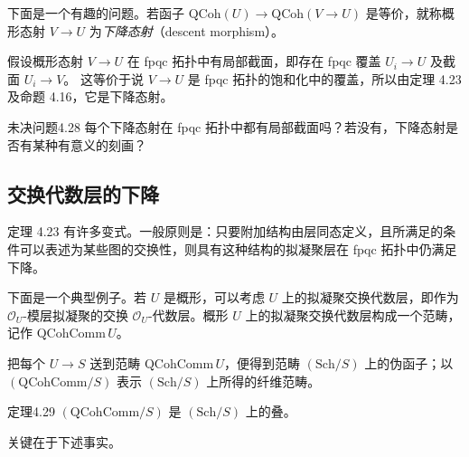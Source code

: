 下面是一个有趣的问题。若函子 $\mathrm{QCoh}(U)\to\mathrm{QCoh}(V\to U)$ 是等价，就称概形态射 $V\to U$ 为\emph{下降态射}（descent morphism）。

假设概形态射 $V\to U$ 在 fpqc 拓扑中有局部截面，即存在 fpqc 覆盖 $U_i\to U$ 及截面 $U_i\to V$。
这等价于说 $V\to U$ 是 fpqc 拓扑的饱和化中的覆盖，所以由定理 4.23 及命题 4.16，它是下降态射。

\begin{origstatement}{未决问题}{4.28}\label{ch04:question428}
每个下降态射在 fpqc 拓扑中都有局部截面吗？若没有，下降态射是否有某种有意义的刻画？
\end{origstatement}

\subsection{交换代数层的下降}
定理 4.23 有许多变式。一般原则是：只要附加结构由层同态定义，且所满足的条件可以表述为某些图的交换性，则具有这种结构的拟凝聚层在 fpqc 拓扑中仍满足下降。

下面是一个典型例子。若 $U$ 是概形，可以考虑 $U$ 上的拟凝聚交换代数层，即作为 $\mathcal O_U$-模层拟凝聚的交换 $\mathcal O_U$-代数层。概形 $U$ 上的拟凝聚交换代数层构成一个范畴，记作 $\mathrm{QCohComm}\,U$。

把每个 $U\to S$ 送到范畴 $\mathrm{QCohComm}\,U$，便得到范畴 $(\mathrm{Sch}/S)$ 上的伪函子；以 $(\mathrm{QCohComm}/S)$ 表示 $(\mathrm{Sch}/S)$ 上所得的纤维范畴。

\begin{origstatement}{定理}{4.29}\label{ch04:thm429}
$(\mathrm{QCohComm}/S)$ 是 $(\mathrm{Sch}/S)$ 上的叠。
\end{origstatement}
关键在于下述事实。

